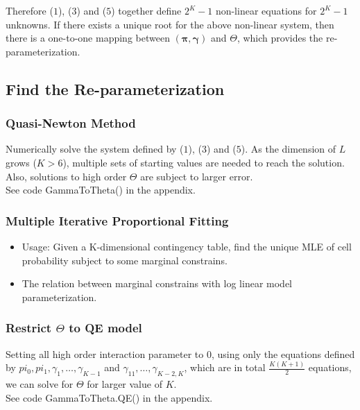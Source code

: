\documentclass[11 pt, a4paper]{article}  %
\begin{document}
Therefore ($1$), ($3$) and ($5$) together define $2^K-1$ non-linear equations for $2^K-1$ unknowns. If there exists a unique root for the above non-linear system, then there is a one-to-one mapping between $(\boldsymbol\pi, \boldsymbol\gamma)$ and $\Theta$, which provides the re-parameterization.

\newpage
\subsection{Find the Re-parameterization}
\subsubsection{Quasi-Newton Method}
Numerically solve the system defined by ($1$), ($3$) and ($5$). As the dimension of $L$ grows ($K>6$), multiple sets of starting values are needed to  reach the solution. Also, solutions to high order $\Theta$ are subject to larger error. \\
See code GammaToTheta() in the appendix.

\subsubsection{Multiple Iterative Proportional Fitting}
\begin{itemize}
\item Usage: Given a K-dimensional contingency table, find the unique MLE of cell probability subject to some marginal constrains.
\item The relation between marginal constrains with log linear model parameterization.
\end{itemize}



\subsubsection{Restrict $\Theta$ to QE model}
Setting all high order interaction parameter to $0$, using only the equations defined by $pi_0, pi_1, \gamma_1,\ldots,\gamma_{K-1}$ and $\gamma_{11},\ldots, \gamma_{K-2,K}$, which are in total $\frac{K(K+1)}{2}$ equations, we can solve for $\Theta$ for larger value of $K$.\\
See code GammaToTheta.QE() in the appendix.




\newpage
\end{document}
